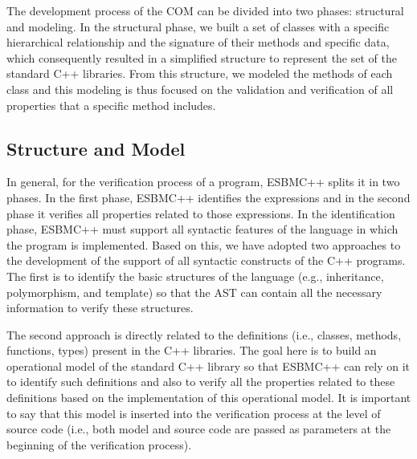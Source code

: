 \documentclass[a4paper]{llncs}
\begin{document}
The development process of the COM can be divided into two phases: structural and modeling. 
In the structural phase, we built a set of classes with a specific hierarchical relationship 
and the signature of their methods and specific data, which consequently resulted 
in a simplified structure to represent the set of the standard C++ libraries. 
From this structure, we modeled the methods of each class and this modeling is thus focused 
on the validation and verification of all properties that a specific method includes.

\subsection{Structure and Model}

In general, for the verification process of a program, ESBMC++ splits it in two phases. In the first
phase, ESBMC++ identifies the expressions and in the second phase it verifies all properties related 
to those expressions. In the identification phase, ESBMC++ must support all syntactic features of the 
language in which the program is implemented. Based on this, we have adopted two approaches to the 
development of the support of all syntactic constructs of the C++ programs. The first is to identify 
the basic structures of the language (e.g., inheritance, polymorphism, and template) so that the AST 
can contain all the necessary information to verify these structures. 

The second approach is directly related to the definitions (i.e., classes, methods, functions, types) 
present in the C++ libraries. The goal here is to build an operational model of the standard C++ library 
so that ESBMC++ can rely on it to identify such definitions and also to verify all the properties related 
to these definitions based on the implementation of this operational model. It is important to say that 
this model is inserted into the verification process at the level of source code (i.e., both model and 
source code are passed as parameters at the beginning of the verification process).
\end{document}
